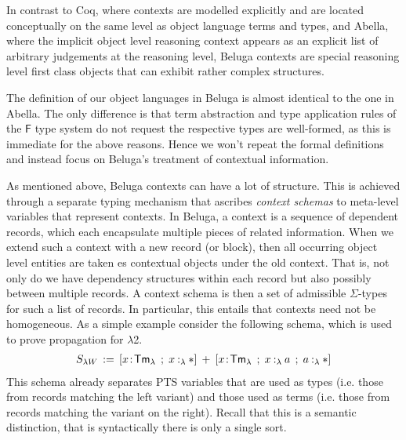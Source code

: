 \documentclass[a4paper,UKenglish]{lipics-v2016}
\newcommand{\ms}{\,}
\newcommand{\mrel}[1]{\mathrel{\ms #1 \ms}}
\newcommand{\eqdef}{\mrel{:=}}
\newcommand{\SysF}{\ensuremath{\mathsf{F}}\xspace}
\newcommand{\SysL}{$\lambda$2\xspace}
\newcommand{\TmL}{\ensuremath{\mathsf{Tm_{\lambda}}}}
\newcommand{\of}{\ensuremath{\!:\!}}
\newcommand{\typingLh}[2]{\ensuremath{#1 \mathbin{:_{\lambda}} #2}}
\newcommand{\Prp}{\ensuremath{\textrm{\textasteriskcentered}}}
\begin{document}
In contrast to Coq, where contexts are modelled explicitly and are located conceptually on the same level as object language terms and types, and Abella, where the implicit object level reasoning context appears as an explicit list of arbitrary judgements at the reasoning level, Beluga contexts are special reasoning level first class objects that can exhibit rather complex structures.

The definition of our object languages in Beluga is almost identical to the one in Abella.
The only difference is that term abstraction and type application rules of the \SysF type system do not request the respective types are well-formed, as this is immediate for the above reasons.
Hence we won't repeat the formal definitions and instead focus on Beluga's treatment of contextual information.

As mentioned above, Beluga contexts can have a lot of structure.
This is achieved through a separate typing mechanism that ascribes \emph{context schemas} to meta-level variables that represent contexts.
In Beluga, a context is a sequence of dependent records, which each encapsulate multiple pieces of related information.
When we extend such a context with a new record (or block), then all occurring object level entities are taken es contextual objects under the old context.
That is, not only do we have dependency structures within each record but also possibly between multiple records.
A context schema is then a set of admissible $\Sigma$-types for such a list of records.
In particular, this entails that contexts need not be homogeneous.
As a simple example consider the following schema, which is used to prove propagation for \SysL.
\begin{align*}
  S_{\lambda W} \eqdef [x\of\TmL \mrel{;} \typingLh{x}{\Prp}] \mrel{+} [x\of\TmL \mrel{;} \typingLh{x}{a} \mrel{;} \typingLh{a}{\Prp}]
\end{align*}
This schema already separates PTS variables that are used as types (i.e. those from records matching the left variant) and those used as terms (i.e. those from records matching the variant on the right).
Recall that this is a semantic distinction, that is syntactically there is only a single sort.
\end{document}
